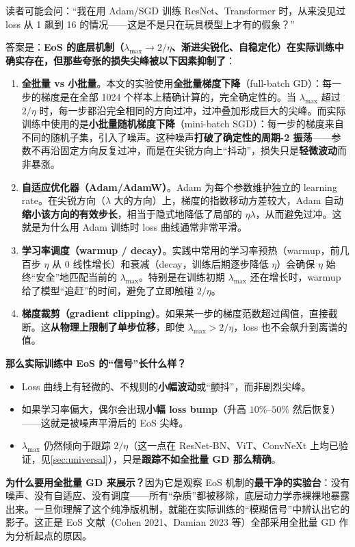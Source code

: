 \documentclass[11pt,a4paper]{ctexart}
\newcommand{\lmax}{\lambda_{\max}}
\begin{document}
读者可能会问：``我在用 Adam/SGD 训练 ResNet、Transformer 时，从来没见过 loss 从 1 飙到 16 的情况——这是不是只在玩具模型上才有的假象？''

答案是：\textbf{EoS 的底层机制（$\lmax \to 2/\eta$、渐进尖锐化、自稳定化）在实际训练中确实存在，但那些夸张的损失尖峰被以下因素抑制了}：

\begin{enumerate}[leftmargin=2em]
  \item \textbf{全批量 vs 小批量}。本文的实验使用\textbf{全批量梯度下降}（full-batch GD）：每一步的梯度是在全部 1024 个样本上精确计算的，完全确定性的。当 $\lmax$ 超过 $2/\eta$ 时，每一步都沿完全相同的方向过冲，过冲叠加形成巨大的尖峰。而实际训练中使用的是\textbf{小批量随机梯度下降}（mini-batch SGD）：每一步的梯度来自不同的随机子集，引入了噪声。这种噪声\textbf{打破了确定性的周期-2 振荡}——参数不再沿固定方向反复过冲，而是在尖锐方向上``抖动''，损失只是\textbf{轻微波动}而非暴涨。

  \item \textbf{自适应优化器（Adam/AdamW）}。Adam 为每个参数维护独立的 learning rate。在尖锐方向（$\lambda$ 大的方向）上，梯度的指数移动方差较大，Adam 自动\textbf{缩小该方向的有效步长}，相当于隐式地降低了局部的 $\eta\lambda$，从而避免过冲。这就是为什么用 Adam 训练时 loss 曲线通常非常平滑。

  \item \textbf{学习率调度（warmup / decay）}。实践中常用的学习率预热（warmup，前几百步 $\eta$ 从 0 线性增长）和衰减（decay，训练后期逐步降低 $\eta$）会确保 $\eta$ 始终``安全''地匹配当前的 $\lmax$。特别是在训练初期 $\lmax$ 还在增长时，warmup 给了模型``追赶''的时间，避免了立即触碰 $2/\eta$。

  \item \textbf{梯度裁剪（gradient clipping）}。如果某一步的梯度范数超过阈值，直接截断。这\textbf{从物理上限制了单步位移}，即使 $\lmax > 2/\eta$，loss 也不会飙升到离谱的值。
\end{enumerate}

\begin{keybox}
\textbf{那么实际训练中 EoS 的``信号''长什么样？}

\begin{itemize}[leftmargin=1.5em, itemsep=2pt]
  \item Loss 曲线上有轻微的、不规则的\textbf{小幅波动}或``颤抖''，而非剧烈尖峰。
  \item 如果学习率偏大，偶尔会出现\textbf{小幅 loss bump}（升高 $10\%$--$50\%$ 然后恢复）——这就是被噪声平滑后的 EoS 尖峰。
  \item $\lmax$ 仍然倾向于跟踪 $2/\eta$（这一点在 ResNet-BN、ViT、ConvNeXt 上均已验证，见\cref{sec:universal}），只是\textbf{跟踪不如全批量 GD 那么精确}。
\end{itemize}

\textbf{为什么要用全批量 GD 来展示？}因为它是观察 EoS 机制的\textbf{最干净的实验台}：没有噪声、没有自适应、没有调度——所有``杂质''都被移除，底层动力学赤裸裸地暴露出来。一旦你理解了这个纯净版机制，就能在实际训练的``模糊信号''中辨认出它的影子。这正是 EoS 文献（Cohen 2021、Damian 2023 等）全部采用全批量 GD 作为分析起点的原因。
\end{keybox}
\end{document}
